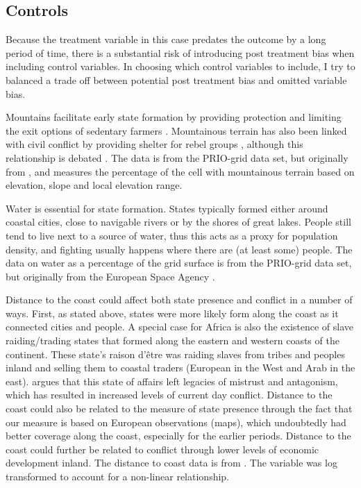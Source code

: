 \documentclass[12pt]{article}
\begin{document}
\subsection{Controls} \label{Controls}

Because the treatment variable in this case predates the outcome by a long
period of time, there is a substantial risk of introducing post treatment bias
when including control variables. In choosing which control variables to
include, I try to balanced a trade off between potential post treatment bias
and omitted variable bias. 

Mountains facilitate early state formation by providing protection and limiting the
exit options of sedentary farmers \citep{Carneiro1988}. Mountainous terrain has
also been linked with civil conflict by providing shelter for rebel groups
\citep{Hegre2006}, although this relationship is debated \citep{Buhaug2002}. The
data is from the PRIO-grid data set, but originally from \citet{Blyth2002}, and
measures the percentage of the cell with mountainous terrain based on elevation,
slope and local elevation range.

Water is essential for state formation. States typically formed either around
coastal cities, close to navigable rivers or by the shores of great lakes.
People still tend to live next to a source of water, thus this acts as a proxy
for population density, and fighting usually happens where there are (at least
some) people. The data on water as a percentage of the grid surface is from the
PRIO-grid data set, but originally from the European Space Agency
\citep{Bontemps2009}.

Distance to the coast could affect both state presence and conflict in a number
of ways. First, as stated above, states were more likely form along the coast as
it connected cities and people. A special case for Africa is also the existence
of slave raiding/trading states that formed along the eastern and western coasts
of the continent. These state's raison d'être was raiding slaves from tribes and
peoples inland and selling them to coastal traders (European in the West and
Arab in the east). \citet{Nunn2008} argues that this state of affairs left
legacies of mistrust and antagonism, which has resulted in increased levels of
current day conflict. Distance to the coast could also be related to the measure
of state presence through the fact that our measure is based on European
observations (maps), which undoubtedly had better coverage along the coast,
especially for the earlier periods. Distance to the coast could further be
related to conflict through lower levels of economic development inland. The
distance to coast data is from \citet{Wessel1996}. The variable was log
transformed to account for a non-linear relationship.
\end{document}
